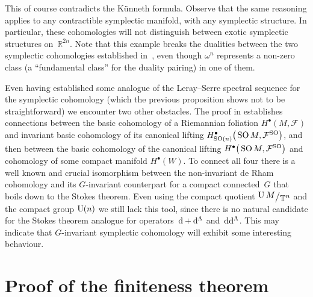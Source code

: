 \documentclass[pdftex]{sigma}
\numberwithin{equation}{section}
\newcommand{\bigslant}[2]{{\raisebox{.2em}{$#1$}\big/\raisebox{-.2em}{$#2$}}}
\begin{document}
This of course contradicts the K\"unneth formula. Observe that the same reasoning applies to any contractible symplectic manifold, with any symplectic structure. In particular, these cohomologies will not distinguish between exotic symplectic structures on~$\mathbb{R}^{2n}$. Note that this example breaks the dualities between the two symplectic cohomologies established in~\cite{tseng}, even though $\omega^n$ represents a non-zero class (a ``fundamental class'' for the duality pairing) in one of them.
\begin{Remark}
Even having established some analogue of the Leray--Serre spectral sequence for the symplectic cohomology (which the previous proposition shows not to be straightforward) we encounter two other obstacles. The proof in \cite{aziztopologiczny} establishes connections between the basic cohomology of a Riemannian foliation $H^{\bullet}(M,\mathcal{F})$ and invariant basic cohomology of its canonical lifting $H^{\bullet}_{{\rm SO}(n)}\big(\operatorname{SO} M,\mathcal{F}^{{\rm SO}}\big)$, and then between the basic cohomology of the canonical lifting $H^{\bullet}\big(\operatorname{SO} M,\mathcal{F}^{{\rm SO}}\big)$ and cohomology of some compact manifold $H^{\bullet}(W)$. To connect all four there is a well known and crucial isomorphism between the non-invariant de Rham cohomology and its $G$-invariant counterpart for a compact connected~$G$ that boils down to the Stokes theorem. Even using the compact quotient $\bigslant{\operatorname{U} M}{\mathbb{T}^n}$ and the compact group ${\rm U}(n)$ we still lack this tool, since there is no natural candidate for the Stokes theorem analogue for operators~${\rm d}+{\rm d}^{\Lambda}$ and~${\rm d}{\rm d}^{\Lambda}$. This may indicate that $G$-invariant symplectic cohomology will exhibit some interesting behaviour.
\end{Remark}

\section{Proof of the finiteness theorem} \label{wreszciedowod}
\end{document}
